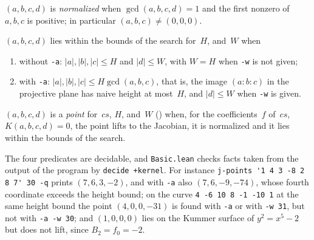 \begin{definition}\label{def:IsNormalized}
  \leanok
  $(a, b, c, d)$ is \emph{normalized} when $\gcd(a, b, c, d) = 1$ and the first nonzero of
  $a, b, c$ is positive; in particular $(a, b, c) \ne (0, 0, 0)$.
\end{definition}

\begin{definition}\label{def:InBounds}
  \leanok
  $(a, b, c, d)$ lies within the bounds of the search for~$H$,  and~$W$ when
  \begin{enumerate}
    \item without \texttt{-a}: $|a|, |b|, |c| \le H$ and $|d| \le W$, with $W = H$ when
      \texttt{-w} is not given;
    \item with \texttt{-a}: $|a|, |b|, |c| \le H \gcd(a, b, c)$, that is, the image $(a : b : c)$
      in the projective plane has naive height at most~$H$, and $|d| \le W$ when \texttt{-w} is
      given.
  \end{enumerate}
\end{definition}

\begin{definition}\label{def:IsPoint}
  \leanok
  $(a, b, c, d)$ is a \emph{point} for~$cs$, $H$,  and~$W$
  () when, for the coefficients~$f$ of~$cs$,
  $K(a, b, c, d) = 0$, the point lifts to the Jacobian, it is normalized and it lies within the
  bounds of the search.
\end{definition}

The four predicates are decidable, and \verb|Basic.lean| checks facts taken from the output of
the program by \verb|decide +kernel|. For instance \verb|j-points '1 4 3 -8 2 8 7' 30 -q| prints
$(7, 6, 3, -2)$, and with \texttt{-a} also $(7, 6, -9, -74)$, whose fourth coordinate exceeds the
height bound; on the curve \verb|4 -6 10 8 -1 -10 1| at the same height bound the point $(4, 0, 0, -31)$ is
found with \texttt{-a} or with \verb|-w 31|, but not with \verb|-a -w 30|; and $(1, 0, 0, 0)$ lies on the
Kummer surface of $y^2 = x^5 - 2$ but does not lift, since $B_2 = f_0 = -2$.

